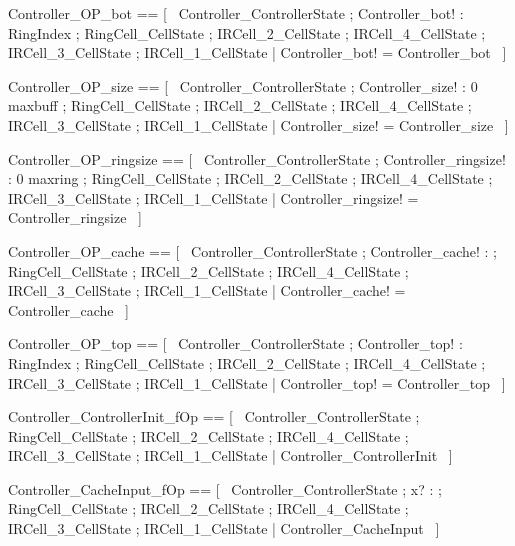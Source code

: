 \documentclass{article}
\begin{document}
\begin{zed}
	Controller\_OP\_bot == [~  \Xi Controller\_ControllerState ; Controller\_bot! : RingIndex ; \Xi RingCell\_CellState ; \Xi IRCell\_2\_CellState ; \Xi IRCell\_4\_CellState ; \Xi IRCell\_3\_CellState ; \Xi IRCell\_1\_CellState | Controller\_bot! = Controller\_bot  ~]
\end{zed}

\begin{zed}
	Controller\_OP\_size == [~  \Xi Controller\_ControllerState ; Controller\_size! : 0 \upto maxbuff ; \Xi RingCell\_CellState ; \Xi IRCell\_2\_CellState ; \Xi IRCell\_4\_CellState ; \Xi IRCell\_3\_CellState ; \Xi IRCell\_1\_CellState | Controller\_size! = Controller\_size  ~]
\end{zed}

\begin{zed}
	Controller\_OP\_ringsize == [~  \Xi Controller\_ControllerState ; Controller\_ringsize! : 0 \upto maxring ; \Xi RingCell\_CellState ; \Xi IRCell\_2\_CellState ; \Xi IRCell\_4\_CellState ; \Xi IRCell\_3\_CellState ; \Xi IRCell\_1\_CellState | Controller\_ringsize! = Controller\_ringsize  ~]
\end{zed}

\begin{zed}
	Controller\_OP\_cache == [~  \Xi Controller\_ControllerState ; Controller\_cache! : \nat ; \Xi RingCell\_CellState ; \Xi IRCell\_2\_CellState ; \Xi IRCell\_4\_CellState ; \Xi IRCell\_3\_CellState ; \Xi IRCell\_1\_CellState | Controller\_cache! = Controller\_cache  ~]
\end{zed}

\begin{zed}
	Controller\_OP\_top == [~  \Xi Controller\_ControllerState ; Controller\_top! : RingIndex ; \Xi RingCell\_CellState ; \Xi IRCell\_2\_CellState ; \Xi IRCell\_4\_CellState ; \Xi IRCell\_3\_CellState ; \Xi IRCell\_1\_CellState | Controller\_top! = Controller\_top  ~]
\end{zed}

\begin{zed}
	Controller\_ControllerInit\_fOp == [~  \Xi Controller\_ControllerState ; \Xi RingCell\_CellState ; \Xi IRCell\_2\_CellState ; \Xi IRCell\_4\_CellState ; \Xi IRCell\_3\_CellState ; \Xi IRCell\_1\_CellState | \lnot \pre Controller\_ControllerInit  ~]
\end{zed}

\begin{zed}
	Controller\_CacheInput\_fOp == [~  \Xi Controller\_ControllerState ; x? : \nat ; \Xi RingCell\_CellState ; \Xi IRCell\_2\_CellState ; \Xi IRCell\_4\_CellState ; \Xi IRCell\_3\_CellState ; \Xi IRCell\_1\_CellState | \lnot \pre Controller\_CacheInput  ~]
\end{zed}
\end{document}
